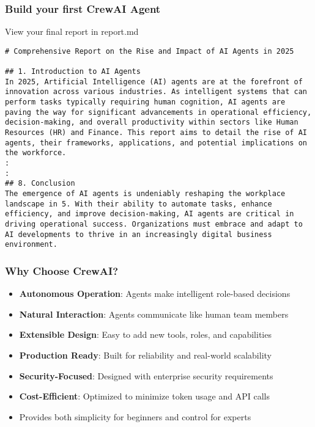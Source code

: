 \begin{frame}[fragile]\frametitle{Build your first CrewAI Agent}

View your final report in report.md
    \begin{lstlisting}
# Comprehensive Report on the Rise and Impact of AI Agents in 2025

## 1. Introduction to AI Agents
In 2025, Artificial Intelligence (AI) agents are at the forefront of innovation across various industries. As intelligent systems that can perform tasks typically requiring human cognition, AI agents are paving the way for significant advancements in operational efficiency, decision-making, and overall productivity within sectors like Human Resources (HR) and Finance. This report aims to detail the rise of AI agents, their frameworks, applications, and potential implications on the workforce.
:
:
## 8. Conclusion
The emergence of AI agents is undeniably reshaping the workplace landscape in 5. With their ability to automate tasks, enhance efficiency, and improve decision-making, AI agents are critical in driving operational success. Organizations must embrace and adapt to AI developments to thrive in an increasingly digital business environment.
    \end{lstlisting}	
\end{frame}


\begin{frame}[fragile]\frametitle{Why Choose CrewAI?}
      \begin{itemize}
        \item \textbf{Autonomous Operation}: Agents make intelligent role-based decisions
        \item \textbf{Natural Interaction}: Agents communicate like human team members
        \item \textbf{Extensible Design}: Easy to add new tools, roles, and capabilities
        \item \textbf{Production Ready}: Built for reliability and real-world scalability
        \item \textbf{Security-Focused}: Designed with enterprise security requirements
        \item \textbf{Cost-Efficient}: Optimized to minimize token usage and API calls
        \item Provides both simplicity for beginners and control for experts
      \end{itemize}
\end{frame}
